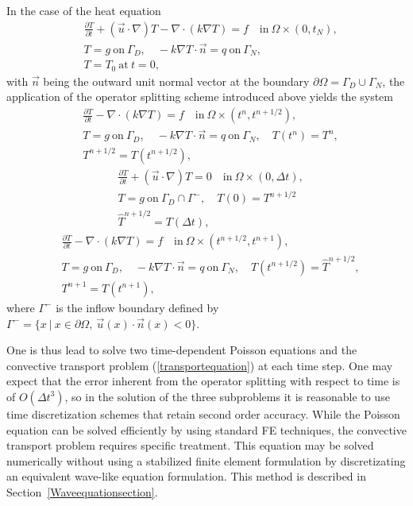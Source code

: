 In the case of the heat equation  
\begin{equation}
\begin{split}
&\frac{\partial T}{\partial t}+(\vec u\cdot\nabla) T-\nabla\cdot(k\nabla T) = 
f \quad \mathrm{in}\ \Omega \times (0,t_N), \\
&T = g  \ \mathrm{on}\ \Gamma_D, \quad  
-k\nabla T \cdot \vec n = q \ \mathrm{on}\ \Gamma_N, \\  
&T = T_0 \ \mathrm{at}\ t=0, 
\end{split}
\end{equation}
with $\vec n$ being the outward unit normal vector at the boundary 
$\partial\Omega=\Gamma_D \cup \Gamma_N$, the application of the operator 
splitting scheme introduced above yields the system 
\begin{equation}
\begin{split}
&\frac{\partial T}{\partial t}-\nabla\cdot(k\nabla T) = f \quad \mathrm{in}\ 
\Omega\times(t^n,t^{n+1/2}), \\
&T=g \ \mathrm{on}\ \Gamma_D, \quad
-k\nabla T \cdot \vec n = q \ \mathrm{on}\ \Gamma_N, \quad T(t^n)=T^n, \\ 
&T^{n+1/2}=T(t^{n+1/2}),
\end{split}
\end{equation}
\begin{equation}\label{transportequation}
\begin{split}
&\frac{\partial T}{\partial t}+(\vec u\cdot\nabla) T = 0 \quad \mathrm{in}\ 
\Omega \times (0,\Delta t), \\ 
&T=g \ \mathrm{on}\ \Gamma_D \cap \Gamma^-, \quad T(0)=T^{n+1/2} \\
&\hat{T}^{n+1/2}=T(\Delta t),
\end{split}
\end{equation}
\begin{equation}
\begin{split}
&\frac{\partial T}{\partial t}-\nabla\cdot(k\nabla T) = f \quad \mathrm{in}\ 
\Omega\times(t^{n+1/2},t^{n+1}), \\ 
&T=g \ \mathrm{on}\ \Gamma_D, \quad 
-k\nabla T \cdot \vec n = q \ \mathrm{on}\ \Gamma_N, \quad
T(t^{n+1/2})=\hat{T}^{n+1/2},\\
&T^{n+1}=T(t^{n+1}),
\end{split}
\end{equation}
where $\Gamma^-$ is the inflow boundary defined by $\Gamma^- = \{ x\ \vert\ 
x \in \partial\Omega,\ \vec u(x)\cdot \vec n(x) < 0 \}$.

One is thus lead to solve two time-dependent Poisson 
equations and the convective transport problem (\ref{transportequation})
at each time step.
One may expect that the error inherent from the operator splitting with 
respect to time is of $O(\Delta t^3)$, so in the solution of
the three subproblems it is reasonable to use time discretization schemes that
retain second order accuracy.
While the Poisson equation can be solved efficiently by using standard FE 
techniques, the convective transport problem requires specific treatment.  
This equation may be solved numerically without using a stabilized finite 
element formulation by discretizating an equivalent wave-like equation
formulation. This method is described in Section~\ref{Waveequationsection}.

